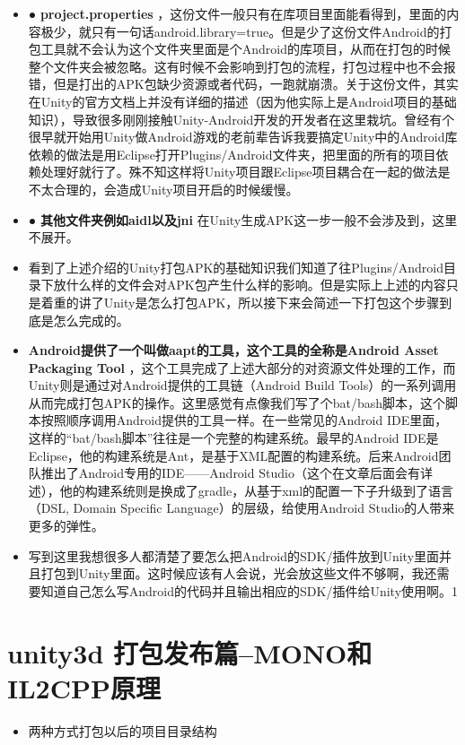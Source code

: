 \documentclass[9pt, b5paper]{article}
\begin{document}
\begin{itemize}
\item ● \textbf{project.properties} ，这份文件一般只有在库项目里面能看得到，里面的内容极少，就只有一句话android.library=true。但是少了这份文件Android的打包工具就不会认为这个文件夹里面是个Android的库项目，从而在打包的时候整个文件夹会被忽略。这有时候不会影响到打包的流程，打包过程中也不会报错，但是打出的APK包缺少资源或者代码，一跑就崩溃。关于这份文件，其实在Unity的官方文档上并没有详细的描述（因为他实际上是Android项目的基础知识），导致很多刚刚接触Unity-Android开发的开发者在这里栽坑。曾经有个很早就开始用Unity做Android游戏的老前辈告诉我要搞定Unity中的Android库依赖的做法是用Eclipse打开Plugins/Android文件夹，把里面的所有的项目依赖处理好就行了。殊不知这样将Unity项目跟Eclipse项目耦合在一起的做法是不太合理的，会造成Unity项目开启的时候缓慢。
\item ● \textbf{其他文件夹例如aidl以及jni} 在Unity生成APK这一步一般不会涉及到，这里不展开。
\item 看到了上述介绍的Unity打包APK的基础知识我们知道了往Plugins/Android目录下放什么样的文件会对APK包产生什么样的影响。但是实际上上述的内容只是着重的讲了Unity是怎么打包APK，所以接下来会简述一下打包这个步骤到底是怎么完成的。
\item \textbf{Android提供了一个叫做aapt的工具，这个工具的全称是Android Asset Packaging Tool} ，这个工具完成了上述大部分的对资源文件处理的工作，而Unity则是通过对Android提供的工具链（Android Build Tools）的一系列调用从而完成打包APK的操作。这里感觉有点像我们写了个bat/bash脚本，这个脚本按照顺序调用Android提供的工具一样。在一些常见的Android IDE里面，这样的“bat/bash脚本”往往是一个完整的构建系统。最早的Android IDE是Eclipse，他的构建系统是Ant，是基于XML配置的构建系统。后来Android团队推出了Android专用的IDE——Android Studio（这个在文章后面会有详述），他的构建系统则是换成了gradle，从基于xml的配置一下子升级到了语言（DSL, Domain Specific Language）的层级，给使用Android Studio的人带来更多的弹性。
\item 写到这里我想很多人都清楚了要怎么把Android的SDK/插件放到Unity里面并且打包到Unity里面。这时候应该有人会说，光会放这些文件不够啊，我还需要知道自己怎么写Android的代码并且输出相应的SDK/插件给Unity使用啊。1
\end{itemize}

\section{unity3d 打包发布篇--MONO和IL2CPP原理}
\label{sec-5}
\begin{itemize}
\item 两种方式打包以后的项目目录结构
\end{itemize}
\end{document}
